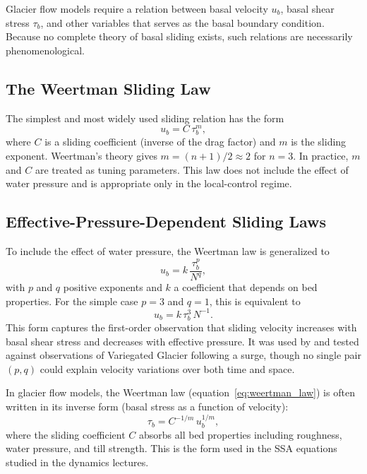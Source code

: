 \documentclass[11pt]{article}
\begin{document}
Glacier flow models require a relation between basal velocity $u_b$, basal shear stress $\tau_b$, and other variables that serves as the basal boundary condition.  Because no complete theory of basal sliding exists, such relations are necessarily phenomenological.

\subsection{The Weertman Sliding Law}

The simplest and most widely used sliding relation has the form
\begin{equation}
  \boxed{u_b = C\,\tau_b^m,}
  \label{eq:weertman_law}
\end{equation}
where $C$ is a sliding coefficient (inverse of the drag factor) and $m$ is the sliding exponent.  Weertman's theory gives $m = (n+1)/2 \approx 2$ for $n = 3$.  In practice, $m$ and $C$ are treated as tuning parameters.  This law does not include the effect of water pressure and is appropriate only in the local-control regime.

\subsection{Effective-Pressure-Dependent Sliding Laws}

To include the effect of water pressure, the Weertman law is generalized to
\begin{equation}
  u_b = k\,\frac{\tau_b^p}{N^q},
  \label{eq:budd_sliding}
\end{equation}
with $p$ and $q$ positive exponents and $k$ a coefficient that depends on bed properties.  For the simple case $p = 3$ and $q = 1$, this is equivalent to
\begin{equation}
  u_b = k\,\tau_b^3\,N^{-1}.
  \label{eq:budd_n3}
\end{equation}
This form captures the first-order observation that sliding velocity increases with basal shear stress and decreases with effective pressure.  It was used by \cite{Budd1979} and tested against observations of Variegated Glacier following a surge, though no single pair $(p, q)$ could explain velocity variations over both time and space.

\medskip
\noindent In glacier flow models, the Weertman law (equation~\ref{eq:weertman_law}) is often written in its inverse form (basal stress as a function of velocity):
\begin{equation}
  \tau_b = C^{-1/m}\,u_b^{1/m},
  \label{eq:inverse_sliding}
\end{equation}
where the sliding coefficient $C$ absorbs all bed properties including roughness, water pressure, and till strength.  This is the form used in the SSA equations studied in the dynamics lectures.
\end{document}
